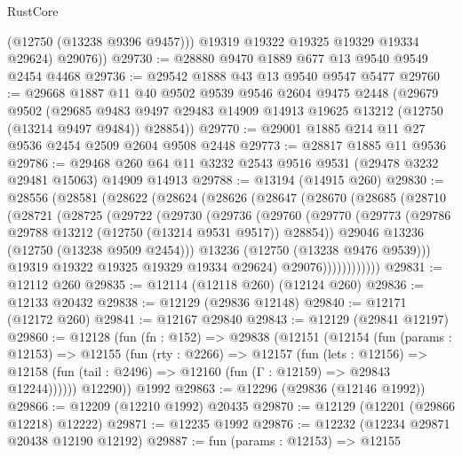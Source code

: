 \begin{lexlean}{RustCore}
\begin{coremodule}
            (@12750 (@13238 @9396 @9457)))
          @19319
          @19322
          @19325
          @19329
          @19334
          @29624)
        @29076))
@29730 := @28880 @9470 @1889 @677 @13 @9540 @9549 @2454 @4468
@29736 := @29542 @1888 @43 @13 @9540 @9547 @5477
@29760 := @29668
    @1887
    @11
    @40
    @9502
    @9539
    @9546
    @2604
    @9475
    @2448
    (@29679
      @9502
      (@29685 @9483 @9497 @29483 @14909 @14913 @19625 @13212 (@12750 (@13214 @9497 @9484)) @28854))
@29770 := @29001 @1885 @214 @11 @27 @9536 @2454 @2509 @2604 @9508 @2448
@29773 := @28817 @1885 @11 @9536
@29786 := @29468 @260 @64 @11 @3232 @2543 @9516 @9531 (@29478 @3232 @29481 @15063) @14909 @14913
@29788 := @13194 (@14915 @260)
@29830 := @28556
    (@28581
      (@28622
        (@28624
          (@28626
            (@28647
              (@28670
                (@28685
                  (@28710
                    (@28721
                      (@28725
                        (@29722
                          (@29730
                            (@29736
                              (@29760
                                (@29770
                                  (@29773
                                    (@29786 @29788 @13212 (@12750 (@13214 @9531 @9517)) @28854))
                                  @29046
                                  @13236
                                  (@12750 (@13238 @9509 @2454)))
                                @13236
                                (@12750 (@13238 @9476 @9539)))
                              @19319
                              @19322
                              @19325
                              @19329
                              @19334
                              @29624)
                            @29076))))))))))))
@29831 := @12112 @260
@29835 := @12114 (@12118 @260) (@12124 @260)
@29836 := @12133 @20432
@29838 := @12129 (@29836 @12148)
@29840 := @12171 (@12172 @260)
@29841 := @12167 @29840
@29843 := @12129 (@29841 @12197)
@29860 := @12128
    (fun (fn : @152) =>
    @29838
      (@12151
        (@12154
          (fun (params : @12153) =>
          @12155
            (fun (rty : @2266) =>
            @12157
              (fun (lets : @12156) =>
              @12158 (fun (tail : @2496) => @12160 (fun (Γ : @12159) => @29843 @12244))))))
        @12290))
    @1992
@29863 := @12296 (@29836 (@12146 @1992))
@29866 := @12209 (@12210 @1992) @20435
@29870 := @12129 (@12201 (@29866 @12218) @12222)
@29871 := @12235 @1992
@29876 := @12232 (@12234 @29871 @20438 @12190 @12192)
@29887 := fun (params : @12153) =>
  @12155

\end{coremodule}
\end{lexlean}
